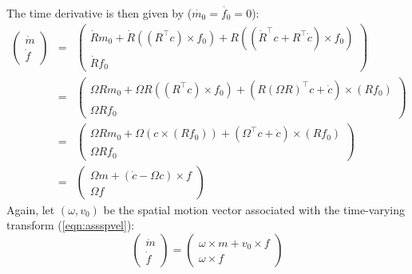 \documentclass[a4paper]{article}
\begin{document}
The time derivative is then given by ($\dot{m_0} = \dot{f_0} = 0$):
\begin{eqnarray}
\left(\begin{array}{c} \dot{m}\\ \dot{f} \end{array}\right) &=&
\left(\begin{array}{c} \dot{R}m_0 + \dot{R}((R^\top c) \times f_0) + R((\dot{R}^\top c + R^\top \dot{c}) \times f_0)\\ \dot{R} f_0 \end{array}\right)\\
&=& \left(\begin{array}{c} \Omega R m_0 + \Omega R ((R^\top c) \times f_0) + (R (\Omega R)^\top c + \dot{c})\times (R f_0)\\ \Omega R f_0 \end{array}\right)\\
&=& \left( \begin{array}{c} \Omega R m_0 + \Omega (c \times (R f_0)) + (\Omega^\top c + \dot{c})\times (R f_0)\\\Omega R f_0 \end{array}\right)\\
&=& \left( \begin{array}{c} \Omega m + (\dot{c} - \Omega c) \times f\\ \Omega f \end{array} \right)
\end{eqnarray}
Again, let $(\omega, v_0)$ be the spatial motion vector associated with the time-varying transform (\ref{eqn:assspvel}):
\begin{equation}
\left(\begin{array}{c} \dot{m} \\ \dot{f} \end{array} \right) = \left(\begin{array}{c} \omega \times m + v_0 \times f\\ \omega \times f \end{array}\right)
\end{equation}
\end{document}

